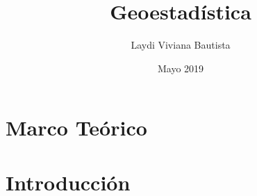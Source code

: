 \documentclass{book}
\title{Geoestadística}
\author{Laydi Viviana Bautista}
\date{Mayo 2019}
\begin{document}
%
%





\chapter{Marco Teórico}



\chapter{Introducción}










%
%


%
%


\printbibliography
\end{document}
